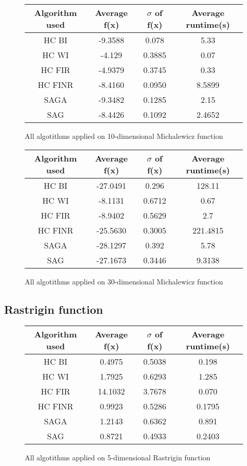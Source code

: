 \documentclass{article}
\begin{document}
\begin{figure}[H]
	\begin{tabular}{|c||c|c|c|} \hline
		Algorithm used & Average f(x) & $\sigma$ of f(x) & Average runtime(s) \\ \hline \hline
		HC BI & -9.3588 & 0.078 & 5.33 \\ \hline
		HC WI & -4.129 & 0.3885 & 0.07 \\ \hline
		HC FIR & -4.9379 & 0.3745 & 0.33 \\ \hline
		HC FINR & -8.4160 & 0.0950 & 8.5899 \\ \hline
		SAGA & -9.3482 & 0.1285 & 2.15 \\ \hline
		SAG & -8.4426 & 0.1092 & 2.4652 \\ \hline
\end{tabular}
\caption{All algotithms applied on 10-dimensional Michalewicz function}
\end{figure}

\begin{figure}[H]
	\begin{tabular}{|c||c|c|c|} \hline
		Algorithm used & Average f(x) & $\sigma$ of f(x) & Average runtime(s) \\ \hline \hline
		HC BI & -27.0491 & 0.296 & 128.11 \\ \hline
		HC WI & -8.1131 & 0.6712 & 0.67 \\ \hline
		HC FIR & -8.9402 & 0.5629 & 2.7 \\ \hline
		HC FINR & -25.5630 & 0.3005 & 221.4815 \\ \hline
		SAGA & -28.1297 & 0.392 & 5.78 \\ \hline
		SAG & -27.1673 & 0.3446 & 9.3138 \\ \hline
\end{tabular}
\caption{All algotithms applied on 30-dimensional Michalewicz function}
\end{figure}

\subsection{Rastrigin function}

\begin{figure}[H]
	\begin{tabular}{|c||c|c|c|} \hline
		Algorithm used & Average f(x) & $\sigma$ of f(x) & Average runtime(s) \\ \hline \hline
		HC BI & 0.4975 & 0.5038 & 0.198 \\ \hline
		HC WI & 1.7925 & 0.6293 & 1.285 \\ \hline
		HC FIR & 14.1032 & 3.7678 & 0.070 \\ \hline
		HC FINR & 0.9923 & 0.5286 & 0.1795 \\ \hline
		SAGA & 1.2143 & 0.6362 & 0.891 \\ \hline
		SAG & 0.8721 & 0.4933 & 0.2403 \\ \hline
\end{tabular}
\caption{All algotithms applied on 5-dimensional Rastrigin function}
\end{figure}
\end{document}
